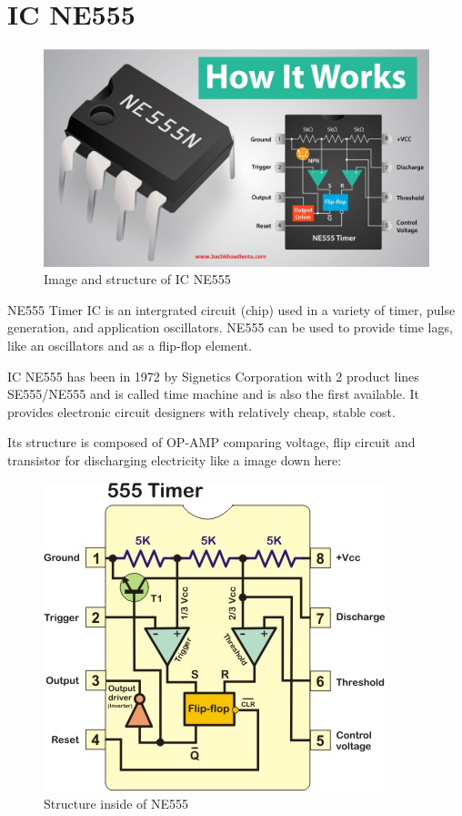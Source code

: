 \documentclass[a4paper]{report}
\begin{document}
    \section{IC NE555}
        \begin{figure}[ht]
            \centering
            \includegraphics[width=0.5\linewidth]{555.jpg}
            \caption{\label{fig:boat3}Image and structure of IC NE555}
        \end{figure}
        \par NE555 Timer IC is an intergrated circuit (chip) used in a variety of timer, pulse generation, 
        and application oscillators. NE555 can be used to provide time lags, like an oscillators and as a 
        flip-flop element.
        \linebreak
        \par IC NE555 has been in 1972 by Signetics Corporation with 2 product lines SE555/NE555 and 
        is called time machine and is also the first available. It provides electronic circuit designers 
        with relatively cheap, stable cost.
        \linebreak
        \par Its structure is composed of OP-AMP comparing voltage, flip circuit and transistor for discharging 
        electricity like a image down here: 
        \begin{figure}[ht]
            \centering
            \includegraphics[width=0.6\linewidth]{inside_the_555_timer.jpg}
            \caption{\label{fig:boat4}Structure inside of NE555}
        \end{figure}
\end{document}
